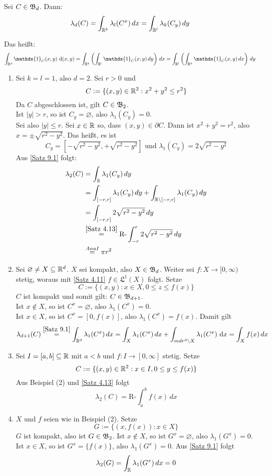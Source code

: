 \documentclass[a4paper,twoside,DIV15,BCOR12mm,chapterprefix=true,headings=onelinechapter]{scrbook}
\begin{document}
\begin{satz}
\label{Satz 9.1}
Sei \(C\in\mathfrak{B}_d\). Dann:
\[ \lambda_d(C)=\int_{\mathbb{R}^k}\lambda_l(C^x)\,dx=\int_{\mathbb{R}^l}\lambda_k(C_y)\,dy \]
\end{satz}
Das heißt:
\[ \int_{\mdr^d}\mathds{1}_{C}(x,y) \text{ d}(x,y) = \int_{\mdr^k}\left(\int_{\mdr^l} \mathds{1}_{C}(x,y)\,dy\right)\,dx = \int_{\mdr^l} \left(\int_{\mdr^k} \mathds{1}_{C}(x,y)\,dx\right)\,dy \]


\begin{beispiel}
\begin{enumerate}
	\item	Sei \(k=l=1\), also \(d=2\). Sei \(r>0\) und \[C:=\{(x,y)\in\mathbb{R}^2: x^2+y^2\leq r^2\}\]
		 Da $C$ abgeschlossen ist, gilt \(C\in\mathfrak{B}_2\).\\
		Ist \(\lvert y\rvert>r\), so ist \(C_y=\varnothing\), also \(\lambda_1(C_y)=0\).\\
		Sei also \(\lvert y\rvert\leq r\). Sei \(x\in\mathbb{R}\) so, dass \((x,y)\in\partial C\). Dann ist \(x^2+y^2=r^2\), also \(x=\pm\sqrt{r^2-y^2}\).
		Das heißt, es ist  \[C_y=\left[-\sqrt{r^2-y^2},+\sqrt{r^2-y^2}\right]\text{ und } \lambda_1(C_y)=2\sqrt{r^2-y^2}\]
		Aus \ref{Satz 9.1} folgt:
		\begin{align*}
			\lambda_2(C)
			&=\int_{\mathbb{R}}\lambda_1(C_y)\,dy \\
			&=\int_{[-r,r]}\lambda_1(C_y)\,dy + \int_{\mathbb{R}\setminus [-r,r]}\lambda_1(C_y)\,dy\\
			&=\int_{[-r,r]}2\sqrt{r^2-y^2}\,dy\\
			&\overset{\ref{Satz 4.13}}= \text{R-}\int^r_{-r}2\sqrt{r^2-y^2}\,dy\\
			&\overset{Ana I}= \pi r^2
		\end{align*}
	\item 	Sei \(\varnothing\neq X\subseteq\mathbb{R}^d\). $X$ sei kompakt, also \(X\in\mathfrak{B}_d\). Weiter sei \(f\colon X\to[0,\infty)\) stetig, woraus mit \ref{Satz 4.11} \(f\in\mathfrak{L}^1(X)\) folgt.
		Setze \[C:=\{(x,y):x\in X, 0\leq z\leq f(x)\}\] 
		$C$ ist kompakt und somit gilt: \(C\in\mathfrak{B}_{d+1}\).\\
		Ist \(x\notin X\), so ist \(C^x=\varnothing\), also \(\lambda_1(C^x)=0\).\\
		Ist \(x\in X\), so ist \(C^x=[0,f(x)]\), also \(\lambda_1(C^x)=f(x)\). Damit gilt
		\[\lambda_{d+1}(C) \overset{\ref{Satz 9.1}}= \int_{\mathbb{R}^d}\lambda_1(C^x)\,dx = \int_X\lambda_1(C^x)\,dx + \int_{mdr^d\setminus X}\lambda_1(C^x) \text{ d}x = \int_Xf(x)\,dx \]
	\item 	Sei \(I=[a,b]\subseteq\mathbb{R}\) mit \(a<b\) und \(f\colon I\to[0,\infty]\) stetig. Setze
		\[C:=\{(x,y)\in\mathbb{R}^2:x\in I, 0\leq y\leq f(x)\}\]
		Aus Beispiel (2) und \ref{Satz 4.13} folgt \[\lambda_2(C)=\text{R-}\int_a^bf(x)\,dx \]
	\item 	$X$ und $f$ seien wie in Beispiel (2). Setze \[G:=\{(x,f(x)):x\in X\}\]
		$G$ ist kompakt, also ist \(G\in\mathfrak{B}_2\). 
		Ist \(x\notin X\), so ist \(G^x=\varnothing\), also \(\lambda_1(G^x)=0\).
		Ist \(x\in X\), so ist \(G^x=\{f(x)\}\), also \(\lambda_1(G^x)=0\).
		Aus \ref{Satz 9.1} folgt \[\lambda_2(G)=\int_{\mathbb{R}}\lambda_1(G^x)\,dx=0\]
\end{enumerate}
\end{beispiel}
\end{document}
